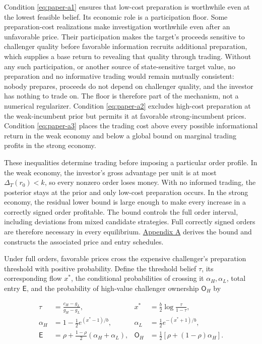 \documentclass[
  12pt,
]{article}
\begin{document}
Condition \eqref{eq:paper-a1} ensures that low-cost preparation is
worthwhile even at the lowest feasible belief. Its economic role is a
participation floor. Some preparation-cost realizations make
investigation worthwhile even after an unfavorable price. Their
participation makes the target's proceeds sensitive to challenger
quality before favorable information recruits additional preparation,
which supplies a base return to revealing that quality through trading.
Without any such participation, or another source of state-sensitive
target value, no preparation and no informative trading would remain
mutually consistent: nobody prepares, proceeds do not depend on
challenger quality, and the investor has nothing to trade on. The floor
is therefore part of the mechanism, not a numerical regularizer.
Condition \eqref{eq:paper-a2} excludes high-cost preparation at the
weak-incumbent prior but permits it at favorable strong-incumbent
prices. Condition \eqref{eq:paper-a3} places the trading cost above
every possible informational return in the weak economy and below a
global bound on marginal trading profits in the strong economy.

These inequalities determine trading before imposing a particular order
profile. In the weak economy, the investor's gross advantage per unit is
at most \(\Delta_T(r_0)<k\), so every nonzero order loses money. With no
informed trading, the posterior stays at the prior and only low-cost
preparation occurs. In the strong economy, the residual lower bound is
large enough to make every increase in a correctly signed order
profitable. The bound controls the full order interval, including
deviations from mixed candidate strategies. Full correctly signed orders
are therefore necessary in every equilibrium.
\hyperref[paper-appendix]{Appendix A} derives the bound and constructs
the associated price and entry schedules.

Under full orders, favorable prices cross the expensive challenger's
preparation threshold with positive probability. Define the threshold
belief \(\tau\), its corresponding flow \(x^*\), the conditional
probabilities of crossing it \(\alpha_H,\alpha_L\), total entry
\(\mathsf E\), and the probability of high-value challenger ownership
\(\mathsf O_H\) by

\[
\begin{aligned}
\tau&=\frac{c_H-g_L}{g_H-g_L},&
x^*&=\frac b2\log\frac\tau{1-\tau},\\
\alpha_H&=1-\frac12e^{(x^*-1)/b},&
\alpha_L&=\frac12e^{-(x^*+1)/b},\\
\mathsf E&=\rho+\frac{1-\rho}{2}(\alpha_H+\alpha_L),&
\mathsf O_H&=\frac12[\rho+(1-\rho)\alpha_H].
\end{aligned}
\tag{12}\label{eq:paper-12}
\]
\end{document}
